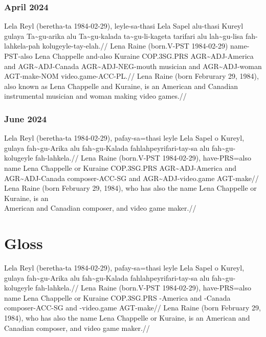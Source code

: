 \subsubsection*{April 2024}

\ex
\begingl
\gla Lela Reyl   (beretha-ta 1984-02-29),   leyle-sa-thasi Lela Sapel      alu-thasi Kureyl gulaya       Ta\~{}gu-arika     alu Ta\~{}gu-kalada   ta\~{}gu-li-kageta   tarifari alu lah\~{}gu-lisa   fah-lahkela-pah kolugeyle-tay-elah.//
\glb Lena Raine  (born.V-PST 1984-02-29)    name-PST-also  Lena Chappelle  and-also  Kuraine COP.3SG.PRS AGR\~{}ADJ-America and AGR\~{}ADJ-Canada AGR\~{}ADJ-NEG-mouth musician and AGR\~{}ADJ-woman AGT-make-NOM    video.game-ACC-PL.//
\glft Lena Raine  (born Februrary 29, 1984), also known as Lena Chappelle and Kuraine, is an American and Canadian instrumental musician and woman making video games.//
\endgl
\xe

\newpage

\subsubsection*{June 2024}

\ex
\begingl
\gla Lela Reyl  (beretha-ta 1984-02-29), pafay-sa=thasi leyle Lela Sapel     o  Kureyl, gulaya      fah\~{}gu-Arika    alu fah\~{}gu-Kalada  fahlahpeyrifari-tay-sa alu fah\~{}gu-kolugeyle   fah-lahkela.//
\glb Lena Raine (born.V-PST 1984-02-29), have-PRS=also  name  Lena Chappelle or Kuraine COP.3SG.PRS AGR\~{}ADJ-America and AGR\~{}ADJ-Canada composer-ACC-SG        and AGR\~{}ADJ-video.game AGT-make//
\glft Lena Raine (born February 29, 1984), who has also the name Lena Chappelle or Kuraine, is an \\American and Canadian composer, and video game maker.//
\endgl
\xe

\section{Gloss}

\ex
\begingl
\gla  Lela Reyl (beretha-ta 1984-02-29), pafay-sa=thasi leyle Lela Sapel o Kureyl, gulaya fah\~{}gu-Arika alu fah\~{}gu-Kalada fahlahpeyrifari-tay-sa alu fah\~{}gu-kolugeyle fah-lahkela.//
\glb  Lena Raine (born.V-PST 1984-02-29), have-PRS=also name Lena Chappelle or Kuraine COP.3SG.PRS \agradj-America and \agradj-Canada composer-ACC-SG and \agradj-video.game AGT-make//
\glft Lena Raine (born February 29, 1984), who has also the name Lena Chappelle or Kuraine, is an American and Canadian composer, and video game maker.//
\endgl 
\xe


